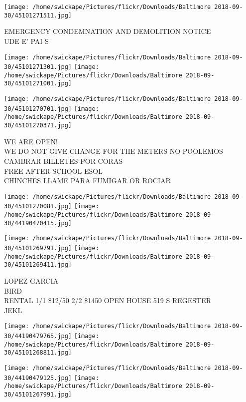 \documentclass[10pt,letterpaper]{article}
\begin{document}
\vspace{0.25in}
\texttt{[image: /home/swickape/Pictures/flickr/Downloads/Baltimore 2018-09-30/45101271511.jpg]}

EMERGENCY CONDEMNATION AND DEMOLITION NOTICE\\
UDE E' PAI S\\
\pagebreak

\texttt{[image: /home/swickape/Pictures/flickr/Downloads/Baltimore 2018-09-30/45101271301.jpg]}
\texttt{[image: /home/swickape/Pictures/flickr/Downloads/Baltimore 2018-09-30/45101271001.jpg]}

\texttt{[image: /home/swickape/Pictures/flickr/Downloads/Baltimore 2018-09-30/45101270701.jpg]}
\texttt{[image: /home/swickape/Pictures/flickr/Downloads/Baltimore 2018-09-30/45101270371.jpg]}

WE ARE OPEN!\\
WE DO NOT GIVE CHANGE FOR THE METERS NO POOLEMOS CAMBRAR BILLETES POR CORAS\\
FREE AFTER{-}SCHOOL ESOL\\
CHINCHES LLAME PARA FUMIGAR OR ROCIAR\\
\pagebreak

\texttt{[image: /home/swickape/Pictures/flickr/Downloads/Baltimore 2018-09-30/45101270081.jpg]}
\texttt{[image: /home/swickape/Pictures/flickr/Downloads/Baltimore 2018-09-30/44190470415.jpg]}

\texttt{[image: /home/swickape/Pictures/flickr/Downloads/Baltimore 2018-09-30/45101269791.jpg]}
\texttt{[image: /home/swickape/Pictures/flickr/Downloads/Baltimore 2018-09-30/45101269411.jpg]}

LOPEZ GARCIA\\
BIRD\\
RENTAL 1/1 \$12/50 2/2 \$1450 OPEN HOUSE 519 S REGESTER\\
JEKL\\
\pagebreak

\texttt{[image: /home/swickape/Pictures/flickr/Downloads/Baltimore 2018-09-30/44190479765.jpg]}
\texttt{[image: /home/swickape/Pictures/flickr/Downloads/Baltimore 2018-09-30/45101268811.jpg]}

\texttt{[image: /home/swickape/Pictures/flickr/Downloads/Baltimore 2018-09-30/44190479125.jpg]}
\texttt{[image: /home/swickape/Pictures/flickr/Downloads/Baltimore 2018-09-30/45101267991.jpg]}
\end{document}
